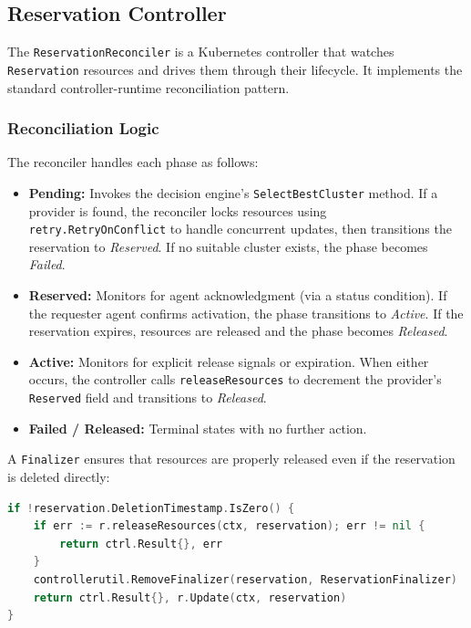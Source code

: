 \subsection{Reservation Controller}
\label{subsec:reservation-controller}

The \texttt{ReservationReconciler} is a Kubernetes controller that watches \texttt{Reservation} resources and drives them through their lifecycle. It implements the standard controller-runtime reconciliation pattern.

\subsubsection{Reconciliation Logic}

The reconciler handles each phase as follows:

\begin{itemize}
    \item \textbf{Pending:} Invokes the decision engine's \texttt{SelectBestCluster} method. If a provider is found, the reconciler locks resources using \texttt{retry.RetryOnConflict} to handle concurrent updates, then transitions the reservation to \textit{Reserved}. If no suitable cluster exists, the phase becomes \textit{Failed}.

    \item \textbf{Reserved:} Monitors for agent acknowledgment (via a status condition). If the requester agent confirms activation, the phase transitions to \textit{Active}. If the reservation expires, resources are released and the phase becomes \textit{Released}.

    \item \textbf{Active:} Monitors for explicit release signals or expiration. When either occurs, the controller calls \texttt{releaseResources} to decrement the provider's \texttt{Reserved} field and transitions to \textit{Released}.

    \item \textbf{Failed / Released:} Terminal states with no further action.
\end{itemize}

A \texttt{Finalizer} ensures that resources are properly released even if the reservation is deleted directly:

\begin{lstlisting}[language=Go, caption={Finalizer-based resource cleanup (simplified)}, label={lst:finalizer}]
if !reservation.DeletionTimestamp.IsZero() {
    if err := r.releaseResources(ctx, reservation); err != nil {
        return ctrl.Result{}, err
    }
    controllerutil.RemoveFinalizer(reservation, ReservationFinalizer)
    return ctrl.Result{}, r.Update(ctx, reservation)
}
\end{lstlisting}

